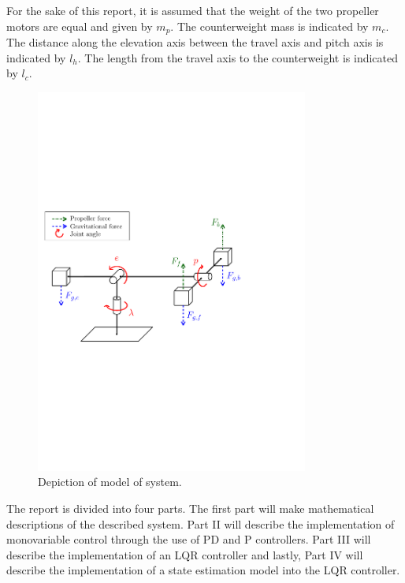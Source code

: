 For the sake of this report, it is assumed that the weight of the two propeller motors are equal and given by $m_p$. The counterweight mass is indicated by $m_c$. The distance along the elevation axis between the travel axis and pitch axis is indicated by $l_h$. The length from the travel axis to the counterweight is indicated by $l_c$. 

\begin{figure}[bp]
	\centering
	\includegraphics[width=0.80\textwidth]{figures/forces.pdf}
	\caption{Depiction of model of system.}
\label{fig:heli}
\end{figure}

The report is divided into four parts. The first part will make mathematical descriptions of the described system. Part II will describe the implementation of monovariable control through the use of PD and P controllers. Part III will describe the implementation of an LQR controller and lastly, Part IV will describe the implementation of a state estimation model into the LQR controller.
